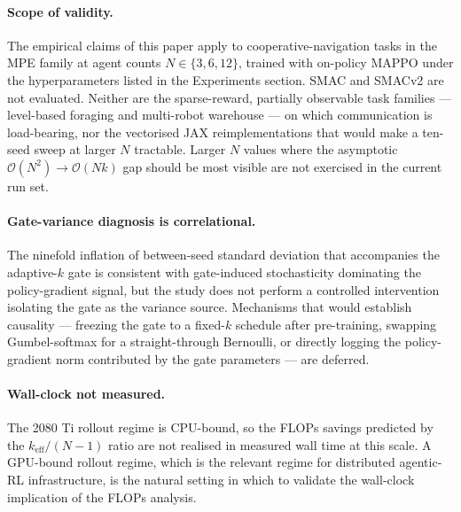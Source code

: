 \paragraph{Scope of validity.} The empirical claims of this paper apply
to cooperative-navigation tasks in the MPE family at agent counts
$N \in \{3, 6, 12\}$, trained with on-policy MAPPO under the
hyperparameters listed in the Experiments section. SMAC and SMACv2
\citep{samvelyan2019smac, ellis2022smacv2} are not evaluated. Neither are
the sparse-reward, partially observable task families --- level-based
foraging and multi-robot warehouse \citep{christianos2020seac} --- on
which communication is load-bearing, nor the vectorised JAX
reimplementations \citep{rutherford2023jaxmarl} that would make a
ten-seed sweep at larger $N$ tractable. Larger $N$ values where the
asymptotic $\mathcal{O}(N^2) \to \mathcal{O}(Nk)$ gap should be most
visible are not exercised in the current run set.

\paragraph{Gate-variance diagnosis is correlational.} The
ninefold inflation of between-seed standard deviation that accompanies
the adaptive-$k$ gate is consistent with gate-induced stochasticity
dominating the policy-gradient signal, but the study does not perform a
controlled intervention isolating the gate as the variance source.
Mechanisms that would establish causality --- freezing the gate to a
fixed-$k$ schedule after pre-training, swapping Gumbel-softmax for a
straight-through Bernoulli, or directly logging the policy-gradient norm
contributed by the gate parameters --- are deferred.

\paragraph{Wall-clock not measured.} The 2080 Ti rollout regime is
CPU-bound, so the FLOPs savings predicted by the
$k_{\mathrm{eff}}/(N{-}1)$ ratio are not realised in measured wall time
at this scale. A GPU-bound rollout regime, which is the relevant regime
for distributed agentic-RL infrastructure, is the natural setting in
which to validate the wall-clock implication of the FLOPs analysis.
